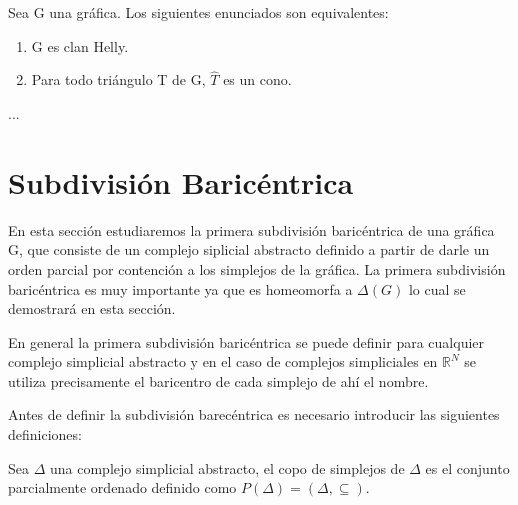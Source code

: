  
\begin{Teo}
Sea G una gráfica. Los siguientes enunciados son equivalentes:
\begin{enumerate}
\item G es clan Helly.
\item Para todo triángulo T de G, $\hat{T}$ es un cono.
\end{enumerate}
\end{Teo}
\begin{Dem}
...
\end{Dem}
\section{Subdivisión Baricéntrica}
En esta sección estudiaremos la primera subdivisión baricéntrica de una gráfica G, que consiste de un complejo siplicial abstracto definido a partir de darle un orden parcial por contención a los simplejos de la gráfica. La primera subdivisión baricéntrica es muy importante ya que es homeomorfa a $\Delta(G)$ lo cual se demostrará en esta sección.

En general la primera subdivisión baricéntrica se puede definir para cualquier complejo simplicial abstracto y en el caso de complejos simpliciales en $\mathbb{R}^N$ se utiliza precisamente el baricentro de cada simplejo de ahí el nombre.

Antes de definir la subdivisión barecéntrica es necesario introducir las siguientes definiciones:

\begin{Defi}
Sea $\Delta$ una complejo simplicial abstracto, el copo de simplejos de $\Delta$ es el conjunto parcialmente ordenado definido como $P(\Delta) = (\Delta,\subseteq)$. 
\end{Defi}

